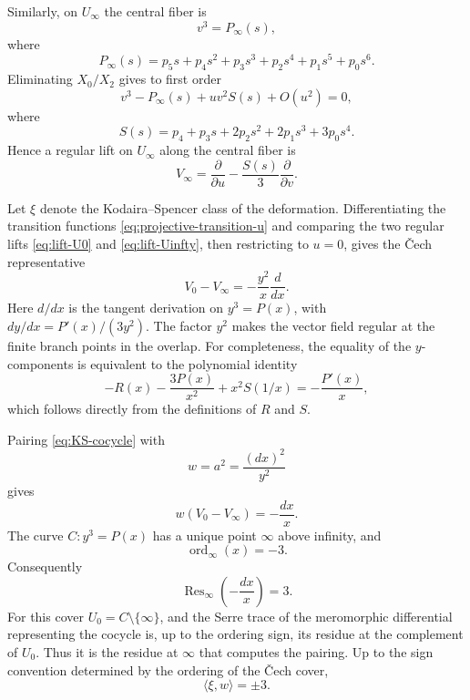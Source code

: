 \documentclass[11pt]{article}
\begin{document}
Similarly, on $U_\infty$ the central fiber is
\begin{equation*}
v^3=P_\infty(s),
\end{equation*}
where
\begin{equation*}
P_\infty(s)
=
p_5s+p_4s^2+p_3s^3+p_2s^4+p_1s^5+p_0s^6.
\end{equation*}
Eliminating $X_0/X_2$ gives to first order
\begin{equation*}
v^3-P_\infty(s)+uv^2S(s)+O(u^2)=0,
\end{equation*}
where
\begin{equation*}
S(s)
=
p_4+p_3s+2p_2s^2+2p_1s^3+3p_0s^4.
\end{equation*}
Hence a regular lift on $U_\infty$ {along the central fiber} is
\begin{equation}
\label{eq:lift-Uinfty}
V_\infty
=
\frac{\partial}{\partial u}
-\frac{S(s)}{3}\frac{\partial}{\partial v}.
\end{equation}

Let $\xi$ denote the Kodaira--Spencer class of the deformation.
Differentiating the transition functions
\eqref{eq:projective-transition-u} and comparing the two regular
lifts \eqref{eq:lift-U0} and \eqref{eq:lift-Uinfty}, then restricting
to $u=0$, gives the \v{C}ech representative
\begin{equation}
\label{eq:KS-cocycle}
V_0-V_\infty
=
-\frac{y^2}{x}\frac{d}{dx}.
\end{equation}
{Here $d/dx$ is the tangent derivation on $y^3=P(x)$, with
$dy/dx=P'(x)/(3y^2)$. The factor $y^2$ makes the vector field
regular at the finite branch points in the overlap.}
For completeness, the equality of the $y$-components is equivalent
to the polynomial identity
\begin{equation*}
-R(x)-\frac{3P(x)}{x^2}
+x^2S(1/x)
=
-\frac{P'(x)}{x},
\end{equation*}
which follows directly from the definitions of $R$ and $S$.

Pairing \eqref{eq:KS-cocycle} with
\begin{equation*}
w=a^2=\frac{(dx)^2}{y^2}
\end{equation*}
gives
\begin{equation}
\label{eq:serre-meromorphic-differential}
w(V_0-V_\infty)
=
-\frac{dx}{x}.
\end{equation}
The curve $C:y^3=P(x)$ has a unique point $\infty$ above infinity,
and
\begin{equation*}
\operatorname{ord}_\infty(x)=-3.
\end{equation*}
Consequently
\begin{equation*}
\operatorname{Res}_\infty\left(-\frac{dx}{x}\right)=3.
\end{equation*}
{For this cover $U_0=C\setminus\{\infty\}$, and the Serre trace
of the meromorphic differential representing the cocycle is, up to
the ordering sign, its residue at the complement of $U_0$.
Thus it is the residue at $\infty$ that computes the pairing.}
Up to the sign convention determined by the ordering of the
\v{C}ech cover,
\begin{equation}
\label{eq:KS-w-pairing}
\langle\xi,w\rangle=\pm3.
\end{equation}
\end{document}
